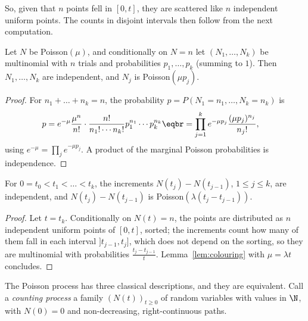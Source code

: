 So, given that $n$ points fell in $[0,t]$, they are scattered like $n$ independent uniform points. The counts in disjoint
intervals then follow from the next computation.

\begin{lemma}[colouring]\label{lem:colouring}
Let $N$ be Poisson$(\mu)$, and conditionally on $N=n$ let $(N_1,\dots,N_k)$ be multinomial with $n$ trials and probabilities $p_1,\dots,p_k$ (summing to
$1$). Then $N_1,\dots,N_k$ are independent, and $N_j$ is Poisson$(\mu p_j)$.
\end{lemma}
\begin{proof}
For $n_1+\dots+n_k=n$, the probability $p=P(N_1=n_1,\dots,N_k=n_k)$ is
\[
\begin{aligned}p&=e^{-\mu}\frac{\mu^n}{n!}\cdot\frac{n!}{n_1!\cdots n_k!}p_1^{n_1}\cdots p_k^{n_k}\eqbr=\prod_{j=1}^ke^{-\mu p_j}\frac{(\mu p_j)^{n_j}}{n_j!},\end{aligned}
\]
using $e^{-\mu}=\prod_je^{-\mu p_j}$. A product of the marginal Poisson probabilities is independence.
\end{proof}

\begin{theorem}\label{thm:increments}
For $0=t_0<t_1<\dots<t_k$, the increments $N(t_j)-N(t_{j-1})$, $1\le j\le k$, are independent, and $N(t_j)-N(t_{j-1})$ is Poisson$(\lambda(t_j-t_{j-1}))$.
\end{theorem}
\begin{proof}
Let $t=t_k$. Conditionally on $N(t)=n$, the points are distributed as $n$ independent uniform points of $[0,t]$, sorted; the increments count
how many of them fall in each interval $]t_{j-1},t_j]$, which does not depend on the sorting, so they are multinomial with probabilities
$\frac{t_j-t_{j-1}}t$. Lemma~\ref{lem:colouring} with $\mu=\lambda t$ concludes.
\end{proof}

The Poisson process has three classical descriptions, and they are equivalent. Call a \emph{counting process} a family $(N(t))_{t\ge0}$ of
random variables with values in $\N$, with $N(0)=0$ and non-decreasing, right-continuous paths.

